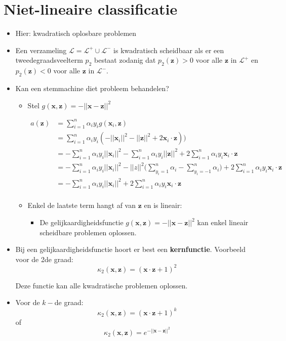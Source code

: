 \section{Niet-lineaire classificatie}
\begin{itemize}
    \item Hier: kwadratisch oplosbare problemen
    \item Een verzameling $\mathcal{L} = \mathcal{L}^+ \cup \mathcal{L}^-$ is kwadratisch scheidbaar als er een tweedegraadsveelterm $p_2$ bestaat zodanig dat $p_2(\textbf{z}) > 0$ voor alle $\textbf{z}$ in $\mathcal{L}^+$ en $p_2(\textbf{z}) < 0$ voor alle $\textbf{z}$ in $\mathcal{L}^-$. 
    \item Kan een stemmachine diet probleem behandelen?
    \begin{itemize}
        \item Stel $g(\textbf{x}, \textbf{z}) = - ||\textbf{x} - \textbf{z} ||^2$
        
        \begin{align*}
            a(\textbf{z}) & = \sum_{i = 1}^n \alpha_iy_ig(\textbf{x}_i, \textbf{z})\\
                          & = \sum_{i = 1}^n \alpha_iy_i(- ||\textbf{x}_i||^2 - ||\textbf{z}||^2 + 2\textbf{x}_i\cdot\textbf{z})) \\
                          & = -\sum_{i = 1}^n \alpha_iy_i||\textbf{x}_i||^2 - \sum_{i = 1}^n \alpha_iy_i||\textbf{z}||^2 + 2\sum_{i = 1}^n \alpha_iy_i\textbf{x}_i\cdot\textbf{z} \\
                          & = -\sum_{i = 1}^n \alpha_iy_i||\textbf{x}_i||^2 - ||z||^2\bigg(\sum_{y_{i} = 1}^n \alpha_i - \sum_{y_{i} = -1}^n \alpha_i\bigg) + 2\sum_{i = 1}^n \alpha_iy_i\textbf{x}_i\cdot\textbf{z} \\
                          & = -\sum_{i = 1}^n \alpha_iy_i||\textbf{x}_i||^2  + 2\sum_{i = 1}^n \alpha_iy_i\textbf{x}_i\cdot\textbf{z} \\
        \end{align*}
        \item Enkel de laatste term hangt af van $\textbf{z}$ en is lineair:
        \begin{itemize}
            \item De gelijkaardigheidsfunctie $g(\textbf{x}, \textbf{z}) = - ||\textbf{x} - \textbf{z} ||^2$ kan enkel lineair scheidbare problemen oplossen.
        \end{itemize}
    \end{itemize}
    \item Bij een gelijkaardigheidsfunctie hoort er best een \textbf{kernfunctie}. Voorbeeld voor de 2de graad:
    $$\kappa_2(\textbf{x},  \textbf{z}) = (\textbf{x}\cdot\textbf{z} + 1)^2$$

    Deze functie kan alle kwadratische problemen oplossen.
    \item Voor de $k-$de graad:
    $$\kappa_2(\textbf{x},  \textbf{z}) = (\textbf{x}\cdot\textbf{z} + 1)^k$$
    of
    $$\kappa_2(\textbf{x},  \textbf{z}) = e^{- ||\textbf{x} - \textbf{z} ||^2}$$
\end{itemize}